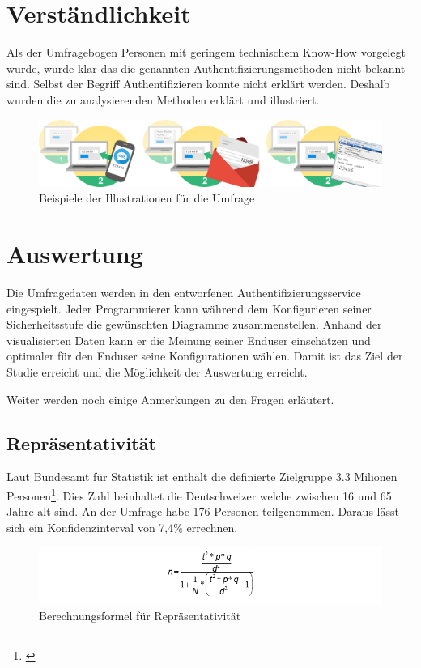 \section{Verständlichkeit}\label{verstuxe4ndlichkeit}

Als der Umfragebogen Personen mit geringem technischem Know-How
vorgelegt wurde, wurde klar das die genannten Authentifizierungsmethoden
nicht bekannt sind. Selbst der Begriff Authentifizieren konnte nicht
erklärt werden. Deshalb wurden die zu analysierenden Methoden erklärt
und illustriert.

\begin{figure}[htbp]
\centering
\includegraphics{images/studien-ilustrationen.jpg}
\caption{Beispiele der Illustrationen für die Umfrage}
\end{figure}

\section{Auswertung}\label{auswertung}

Die Umfragedaten werden in den entworfenen Authentifizierungsservice
eingespielt. Jeder Programmierer kann während dem Konfigurieren seiner
Sicherheitsstufe die gewünschten Diagramme zusammenstellen. Anhand der
visualisierten Daten kann er die Meinung seiner Enduser einschätzen und
optimaler für den Enduser seine Konfigurationen wählen. Damit ist das
Ziel der Studie erreicht und die Möglichkeit der Auswertung erreicht.

Weiter werden noch einige Anmerkungen zu den Fragen erläutert.

\subsection{Repräsentativität}\label{repruxe4sentativituxe4t}

Laut Bundesamt für Statistik ist enthält die definierte Zielgruppe 3.3
Milionen Personen\footnote{\autocite{bfs}}. Dies Zahl beinhaltet die
Deutschweizer welche zwischen 16 und 65 Jahre alt sind. An der Umfrage
habe 176 Personen teilgenommen. Daraus lässt sich ein Konfidenzinterval
von 7,4\% errechnen.

\begin{figure}[htbp]
\centering
\includegraphics{images/repraesentativitaet.jpg}
\caption{Berechnungsformel für Repräsentativität}
\end{figure}

